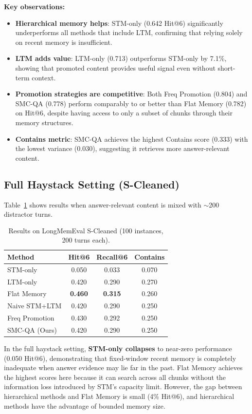 \documentclass{article}
\begin{document}
\textbf{Key observations:}
\begin{itemize}
    \item \textbf{Hierarchical memory helps}: STM-only (0.642 Hit@6) significantly underperforms all methods that include LTM, confirming that relying solely on recent memory is insufficient.
    \item \textbf{LTM adds value}: LTM-only (0.713) outperforms STM-only by 7.1\%, showing that promoted content provides useful signal even without short-term context.
    \item \textbf{Promotion strategies are competitive}: Both Freq Promotion (0.804) and SMC-QA (0.778) perform comparably to or better than Flat Memory (0.782) on Hit@6, despite having access to only a subset of chunks through their memory structures.
    \item \textbf{Contains metric}: SMC-QA achieves the highest Contains score (0.333) with the lowest variance (0.030), suggesting it retrieves more answer-relevant content.
\end{itemize}

\subsection{Full Haystack Setting (S-Cleaned)}

Table~\ref{tab:scleaned} shows results when answer-relevant content is mixed with $\sim$200 distractor turns.

\begin{table}[h]
\centering
\caption{Results on LongMemEval S-Cleaned (100 instances, 200 turns each).}
\label{tab:scleaned}
\begin{tabular}{lccc}
\toprule
\textbf{Method} & \textbf{Hit@6} & \textbf{Recall@6} & \textbf{Contains} \\
\midrule
STM-only & 0.050 & 0.033 & 0.070 \\
LTM-only & 0.420 & 0.290 & 0.270 \\
Flat Memory & \textbf{0.460} & \textbf{0.315} & 0.260 \\
Naive STM+LTM & 0.420 & 0.290 & 0.250 \\
Freq Promotion & 0.430 & 0.292 & 0.250 \\
SMC-QA (Ours) & 0.420 & 0.290 & 0.250 \\
\bottomrule
\end{tabular}
\end{table}

In the full haystack setting, \textbf{STM-only collapses} to near-zero performance (0.050 Hit@6), demonstrating that fixed-window recent memory is completely inadequate when answer evidence may lie far in the past. Flat Memory achieves the highest scores here because it can search across all chunks without the information loss introduced by STM's capacity limit. However, the gap between hierarchical methods and Flat Memory is small (4\% Hit@6), and hierarchical methods have the advantage of bounded memory size.
\end{document}
